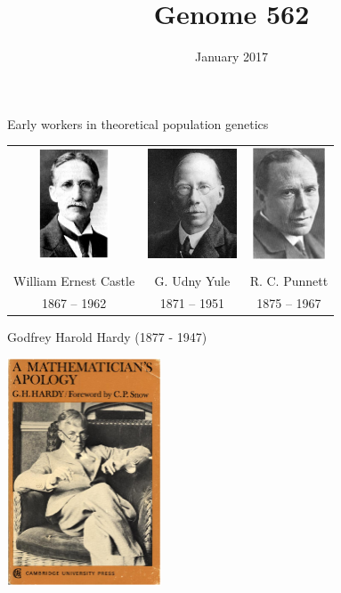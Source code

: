 \documentclass[bluish,slideColor,colorBG,pdf]{prosper}
\author{January 2017}
\title{Genome 562}
\begin{document}
\maketitle

\begin{slide}[Replace]{Early workers in theoretical population genetics}
\vspace{0.5in}

\begin{center}
\begin{tabular}{c c c}
\includegraphics[height=1.3in]{Castle.ps} &
\includegraphics[height=1.3in]{Yule.ps} &
\includegraphics[height=1.3in]{Punnett.ps}\\
& & \\
William Ernest Castle & G. Udny Yule & R. C. Punnett\\
\vspace{0.1in}
1867 -- 1962 & 1871 -- 1951 & 1875 -- 1967
\end{tabular}
\end{center}

\end{slide}

\begin{slide}[Replace]{Godfrey Harold Hardy (1877 - 1947) }

\centerline{\includegraphics[width=1.8in]{hardy.ps}}

\end{slide}
\end{document}
